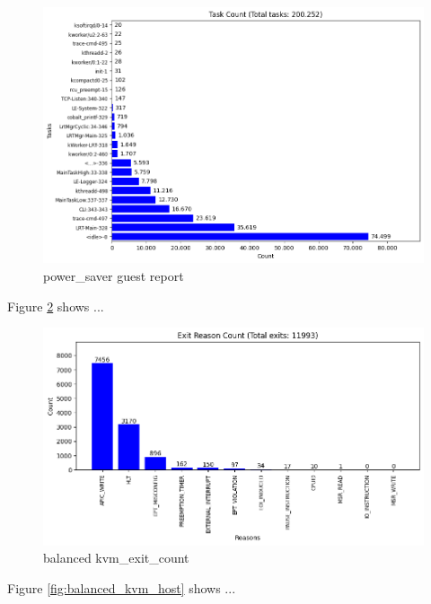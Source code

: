 \documentclass[MMR,Master,english]{twbook}
\begin{document}
\begin{figure}[H]
	\centering
	\includegraphics[width=1.0\columnwidth]{img/power_saver/results_guest_report.png}
	\caption[power\_saver guest report]{power\_saver guest report}
	\label{fig:power_saver_kvm_guest}
\end{figure}
\clearpage



Figure \ref{fig:balanced_kvm_exit} shows ...

\begin{figure}[H]
	\centering
	\includegraphics[width=1.0\columnwidth]{img/balanced/kvm_exit_count.png}
	\caption[balanced kvm\_exit\_count]{balanced kvm\_exit\_count}
	\label{fig:balanced_kvm_exit}
\end{figure}
\clearpage

Figure \ref{fig:balanced_kvm_host} shows ...
\end{document}

